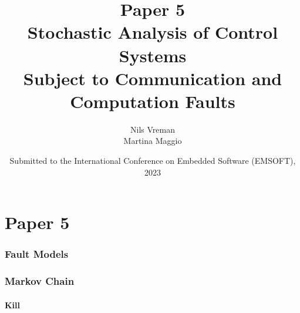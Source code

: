 \section{Paper 5}

\title[PhD Defence]{
    {\Huge Paper 5} \\
    \vspace{2mm}
    {\Large Stochastic Analysis of Control Systems}\\
    {\Large Subject to Communication and Computation Faults}
}
\author[Nils Vreman]{
    Nils Vreman \\
    \vspace{3mm}
    {\large Martina Maggio}
}
\date[EMSOFT 2023]{
    Submitted to the International Conference on Embedded Software (EMSOFT), 2023\\
}
\notitlelogo
{}


\begin{frame}
    \frametitle{Fault Models}
    \begin{figure}
        \centering
        \only<2>{}%
        \only<3>{}%
    \end{figure}
\end{frame}

\begin{frame}
    \frametitle{Markov Chain}%
    \framesubtitle{Kill}%
    \vspace{-2em}
    \begin{figure}
        \centering
        \only<2>{}%
        \only<3>{}%
    \end{figure}
\end{frame}
